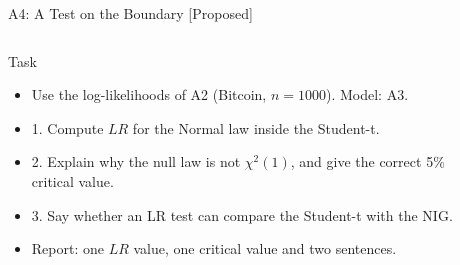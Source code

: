 \begin{frame}{A4: A Test on the Boundary [Proposed]}
\propsub
\itemsize{\scriptsize}
\begin{columns}[T]
\begin{column}{\taskw}
\begin{block}{Task}
\begin{itemize}
    \item Use the log-likelihoods of A2 (Bitcoin, $n = 1000$). Model: A3.
    \item 1. Compute $LR$ for the Normal law inside the Student-t.
    \item 2. Explain why the null law is not $\chi^2(1)$, and give the correct 5\% critical value.
    \item 3. Say whether an LR test can compare the Student-t with the NIG.
    \item Report: one $LR$ value, one critical value and two sentences.
\end{itemize}
\end{block}
\end{column}
\begin{column}{\solw}
\end{column}
\end{columns}
\end{frame}

